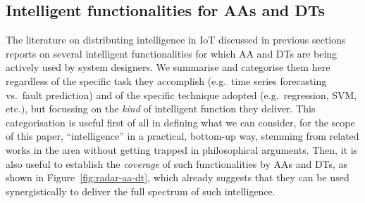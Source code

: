 \subsection{Intelligent functionalities for AAs and DTs}
\label{ssec:functions}

The literature on distributing intelligence in IoT discussed in previous sections reports on several intelligent functionalities for which AA and DTs are being actively used by system designers. 
%
We summarise and categorise them here regardless of the specific task they accomplish (e.g.\ time series forecasting vs.\ fault prediction) and of the specific technique adopted (e.g.\ regression, SVM, etc.), but focussing on the \textit{kind} of intelligent function they deliver.
%
This categorisation is useful first of all in defining what we can consider, for the scope of this paper, ``intelligence'' in a practical, bottom-up way, stemming from related works in the area without getting trapped in philosophical arguments. 
%
Then, it is also useful to establish the \emph{coverage} of such functionalities by AAs and DTs, as shown in Figure~\ref{fig:radar-aa-dt}, which already suggests that they can be used synergistically to deliver the full spectrum of such intelligence. 
%
